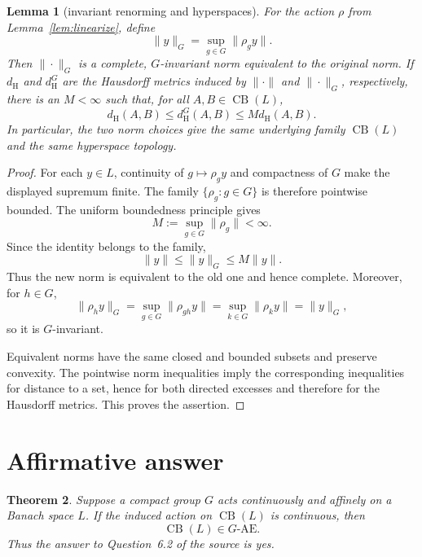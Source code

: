\documentclass[11pt]{article}
\newtheorem{theorem}{Theorem}
\newtheorem{lemma}[theorem]{Lemma}
\newcommand{\CB}{\operatorname{CB}}
\newcommand{\dH}{d_{\mathrm H}}
\begin{document}
\begin{lemma}[invariant renorming and hyperspaces]\label{lem:renorm}
For the action $\rho$ from Lemma~\ref{lem:linearize}, define
\[
  \|y\|_G=\sup_{g\in G}\|\rho_gy\|.
\]
Then $\|\cdot\|_G$ is a complete, $G$-invariant norm equivalent to the
original norm.  If $\dH$ and $\dH^G$ are the Hausdorff metrics induced by
$\|\cdot\|$ and $\|\cdot\|_G$, respectively, there is an $M<\infty$ such
that, for all $A,B\in\CB(L)$,
\[
  \dH(A,B)\leq \dH^G(A,B)\leq M\dH(A,B).
\]
In particular, the two norm choices give the same underlying family
$\CB(L)$ and the same hyperspace topology.
\end{lemma}

\begin{proof}
For each $y\in L$, continuity of $g\mapsto\rho_gy$ and compactness of $G$
make the displayed supremum finite.  The family
$\{\rho_g:g\in G\}$ is therefore pointwise bounded.  The uniform boundedness
principle gives
\[
  M:=\sup_{g\in G}\|\rho_g\|<\infty.
\]
Since the identity belongs to the family,
\[
  \|y\|\leq\|y\|_G\leq M\|y\|.
\]
Thus the new norm is equivalent to the old one and hence complete.  Moreover,
for $h\in G$,
\[
 \|\rho_hy\|_G
 =\sup_{g\in G}\|\rho_{gh}y\|
 =\sup_{k\in G}\|\rho_ky\|=\|y\|_G,
\]
so it is $G$-invariant.

Equivalent norms have the same closed and bounded subsets and preserve
convexity.  The pointwise norm inequalities imply the corresponding
inequalities for distance to a set, hence for both directed excesses and
therefore for the Hausdorff metrics.  This proves the assertion.
\end{proof}

\section{Affirmative answer}

\begin{theorem}\label{thm:main}
Suppose a compact group $G$ acts continuously and affinely on a Banach space
$L$.  If the induced action on $\CB(L)$ is continuous, then
\[
  \CB(L)\in G\text{-}\mathrm{AE}.
\]
Thus the answer to Question~6.2 of the source is yes.
\end{theorem}
\end{document}
